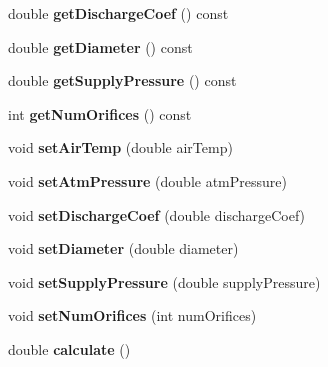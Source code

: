 \begin{DoxyCompactItemize}
double {\bfseries get\+Discharge\+Coef} () const
\item 
\mbox{\label{class_orifice_method_data_ac7fa3a032be60cfee2b549221bc3d42c}} 
double {\bfseries get\+Diameter} () const
\item 
\mbox{\label{class_orifice_method_data_ad62e13923b1fa76ecc52cba439e914af}} 
double {\bfseries get\+Supply\+Pressure} () const
\item 
\mbox{\label{class_orifice_method_data_a548e339ee8e96f23b6edf17438b0096b}} 
int {\bfseries get\+Num\+Orifices} () const
\item 
\mbox{\label{class_orifice_method_data_a4187943ff754f0418cd6b0e634c596d2}} 
void {\bfseries set\+Air\+Temp} (double air\+Temp)
\item 
\mbox{\label{class_orifice_method_data_af6cb7bc9e4576a69fc2e0d5134a15f15}} 
void {\bfseries set\+Atm\+Pressure} (double atm\+Pressure)
\item 
\mbox{\label{class_orifice_method_data_a7165032624c746feebcb1e7cafd90015}} 
void {\bfseries set\+Discharge\+Coef} (double discharge\+Coef)
\item 
\mbox{\label{class_orifice_method_data_a42f7848cba5bc63f76e1ef86b2c13eb5}} 
void {\bfseries set\+Diameter} (double diameter)
\item 
\mbox{\label{class_orifice_method_data_a16a3ab8726b1a83679a8f1517d16a243}} 
void {\bfseries set\+Supply\+Pressure} (double supply\+Pressure)
\item 
\mbox{\label{class_orifice_method_data_a684f185fcd923e6128faa3a442964e64}} 
void {\bfseries set\+Num\+Orifices} (int num\+Orifices)
\item 
\mbox{\label{class_orifice_method_data_a98e7e2a358d23a8f264590c087c6db94}} 
double {\bfseries calculate} ()
\item 
\mbox{\label{class_orifice_method_data_aa1ae1565f565e81e4ac5ffd91c64cfd7}} 

\end{DoxyCompactItemize}
